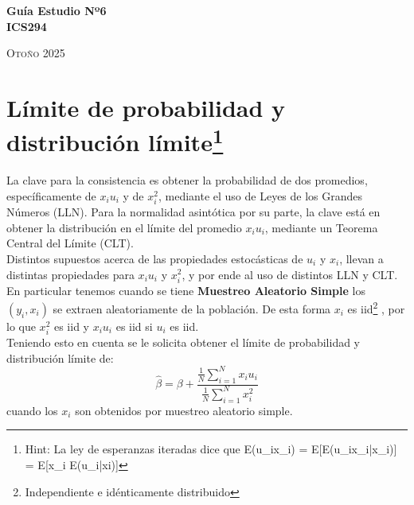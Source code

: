 \documentclass{exam}
\begin{document}
\begin{center}


\LARGE{\textbf{Guía Estudio Nº6}}\\
\LARGE{\textbf{ICS294}}\\
\bigskip
\bigskip


\normalsize{\textsc{Otoño 2025}}

\end{center}

\section{Límite de probabilidad y distribución límite\footnote{Hint: La ley de esperanzas iteradas dice que E(u_ix_i) = E[E(u_ix_i|x_i)] = E[x_i E(u_i|xi)]}} La clave para la consistencia es obtener la probabilidad de dos promedios, espec\'ificamente de $x_i u_i$ y de $x_i^2$, mediante el uso de Leyes de los Grandes N\'umeros (LLN). Para la normalidad asint\'otica por su parte, la clave est\'a en obtener la distribuci\'on en el l\'imite del promedio $x_i u_i$, mediante un Teorema Central del L\'imite (CLT).\\

Distintos supuestos acerca de las propiedades estoc\'asticas de $u_i$ y $x_i$, llevan a distintas propiedades para $x_i u_i$ y $x_i^2$, y por ende al uso de distintos LLN y CLT. En particular tenemos cuando se tiene \textbf{Muestreo Aleatorio Simple} los $(y_i , x_i)$ se extraen aleatoriamente de la poblaci\'on. De esta forma $x_i$ es iid\footnote{Independiente e idénticamente distribuido} , por lo que $x_i^2$ es iid y $x_i u_i$ es iid si $u_i$ es iid.\\

Teniendo esto en cuenta se le solicita obtener el límite de probabilidad y distribución límite de:
    \[\hat{\beta} = \beta + \frac{\frac{1}{N} \sum_{i=1}^{N} x_i u_i}{\frac{1}{N} \sum_{i=1}^{N} x_i^2}\]
cuando los $x_i$ son obtenidos por muestreo aleatorio simple.\\

\end{document}
